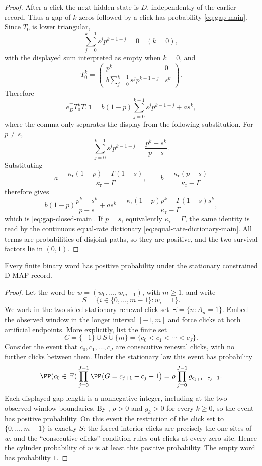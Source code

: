 \begin{proof}
After a click the next hidden state is \(D\), independently of the earlier
record.  Thus a gap of \(k\) zeros followed by a click has probability
\eqref{eq:gap-main}.  Since \(T_0\) is lower triangular,
\[
\textstyle\sum_{j=0}^{k-1}s^jp^{k-1-j}=0\quad(k=0),
\]
with the displayed sum interpreted as empty when \(k=0\), and
\[
T_0^k=
\begin{pmatrix}
p^k&0\\
b\textstyle\sum_{j=0}^{k-1}s^jp^{k-1-j}&s^k
\end{pmatrix}.
\]
Therefore
\[
e_D^\top T_0^kT_1\mathbf1
=b(1-p)\textstyle\sum_{j=0}^{k-1}s^jp^{k-1-j}+as^k,
\]
where the comma only separates the display from the following substitution.
For \(p\ne s\),
\[
\sum_{j=0}^{k-1}s^jp^{k-1-j}=\frac{p^k-s^k}{p-s}.
\]
Substituting
\[
a=\frac{\kappa_{\mathrm r}(1-p)-\Gamma(1-s)}
        {\kappa_{\mathrm r}-\Gamma},
\qquad
b=\frac{\kappa_{\mathrm r}(p-s)}
        {\kappa_{\mathrm r}-\Gamma}
\]
therefore gives
\[
b(1-p)\frac{p^k-s^k}{p-s}+as^k
=
\frac{\kappa_{\mathrm r}(1-p)p^k-\Gamma(1-s)s^k}
     {\kappa_{\mathrm r}-\Gamma},
\]
which is \eqref{eq:gap-closed-main}.  If \(p=s\), equivalently
\(\kappa_{\mathrm r}=\Gamma\), the same identity is read by the continuous
equal-rate dictionary \eqref{eq:equal-rate-dictionary-main}.  All terms are
probabilities of disjoint paths, so they are positive, and the two survival
factors lie in \((0,1)\).
\end{proof}

\begin{corollary}\label{cor:word-support-main}
Every finite binary word has positive probability under the stationary
constrained D-MAP record.
\end{corollary}

\begin{proof}
Let the word be \(w=(w_0,\ldots,w_{m-1})\), with \(m\ge1\), and write
\[
S=\{i\in\{0,\ldots,m-1\}:w_i=1\}.
\]
We work in the two-sided stationary renewal click set
\(\varXi=\{n:A_n=1\}\).  Embed the observed window in the longer interval
\([-1,m]\) and force clicks at both artificial endpoints.  More explicitly,
list the finite set
\[
C=\{-1\}\cup S\cup\{m\}=\{c_0<c_1<\cdots<c_J\}.
\]
Consider the event that \(c_0,c_1,\ldots,c_J\) are consecutive renewal
clicks, with no further clicks between them.  Under the stationary law this
event has probability
\[
\PP(c_0\in\varXi)\prod_{j=0}^{J-1}
\PP\bigl(G=c_{j+1}-c_j-1\bigr)
=\rho\prod_{j=0}^{J-1}g_{c_{j+1}-c_j-1}.
\]
Each displayed gap length is a nonnegative integer, including at the two
observed-window boundaries.  By ,
\(\rho>0\) and \(g_k>0\) for every \(k\ge0\), so the event has positive
probability.  On this event the restriction of the click set to
\(\{0,\ldots,m-1\}\) is exactly \(S\): the forced interior clicks are precisely
the one-sites of \(w\), and the ``consecutive clicks'' condition rules out
clicks at every zero-site.  Hence the cylinder probability of \(w\) is at
least this positive probability.  The empty word has probability \(1\).
\end{proof}

